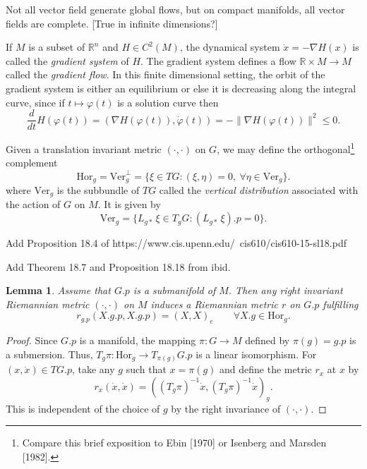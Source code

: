\documentclass{article}
\theoremstyle{plain}
\newtheorem{lem}[teo]{Lemma}
\theoremstyle{definition}
\newcommand{\R}{\ensuremath{\mathbb{R}}}
\begin{document}
Not all vector field generate global flows, but on compact manifolds, all vector fields are complete. [True in infinite dimensions?]

If $M$ is a subset of $\R^n$ and $H\in C^2(M)$, the dynamical system $\dot{x}=-\nabla H(x)$ is called the \textit{gradient system} of $H$. The gradient system defines a flow $\R\times M\to M$ called the \textit{gradient flow}. In this finite dimensional setting, the orbit of the gradient system is either an equilibrium or else it is decreasing along the integral curve, since if $t\mapsto \varphi(t)$ is a solution curve then
\[
\frac{d}{dt}H(\varphi(t))=(\nabla H(\varphi(t)),\dot{\varphi}(t))=-\|\nabla H(\varphi(t))\|^2\leq 0.
\]




Given a translation invariant metric $(\cdot,\cdot)$ on $G$, we may define the orthogonal\footnote{Compare this brief exposition to Ebin [1970] or Isenberg and Marsden [1982].}  complement
\[
\mathrm{Hor}_g=\mathrm{Ver}_g^\perp=\{\xi\in TG : (\xi,\eta)=0,\ \forall\eta\in\mathrm{Ver}_g\}.
\]
where $\mathrm{Ver}_g$ is the subbundle of $TG$ called the \textit{vertical distribution} associated with the action of $G$ on $M$. It is given by
\[
\mathrm{Ver}_g=\{L_{g*}\,\xi\in T_{g}G : (L_{g*}\,\xi).p=0\}.
\]


Add Proposition 18.4 of https://www.cis.upenn.edu/~cis610/cis610-15-sl18.pdf

Add Theorem 18.7 and Proposition 18.18 from ibid.

\begin{lem}
Assume that $G.p$ is a submanifold of $M$. Then any right invariant Riemannian metric $(\cdot,\cdot)$ on $M$ induces a Riemannian metric $r$ on $G.p$ fulfilling
\[
r_{g.p}(X.g.p,X.g.p)=(X,X)_e \qquad\forall X.g\in\mathrm{Hor}_g.
\]
\end{lem}
\begin{proof}
Since $G.p$ is a manifold, the mapping $\pi:G\to M$ defined by $\pi(g)=g.p$ is a submersion. Thus, $T_g\pi: \mathrm{Hor}_g\to T_{\pi(g)}G.p$ is a linear isomorphism. For $(x,\dot{x})\in TG.p$, take any $g$ such that $x=\pi(g)$ and define the metric $r_x$ at $x$ by
\[
r_x(\dot{x},\dot{x})=\left((T_g\pi)^{-1}\dot{x},(T_g\pi)^{-1}\dot{x}\right)_g.
\]
This is independent of the choice of $g$ by the right invariance of $(\cdot,\cdot)$.
\end{proof}
\end{document}
